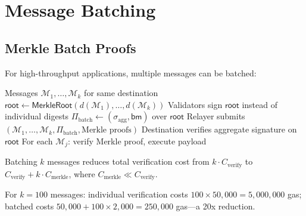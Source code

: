 \section{Message Batching}
\label{sec:batching}

\subsection{Merkle Batch Proofs}

For high-throughput applications, multiple messages can be batched:

\begin{algorithm}[H]
\caption{Batched Warp Delivery}
\label{alg:batch}
\begin{algorithmic}[1]
\Require Messages $\mathcal{M}_1, \ldots, \mathcal{M}_k$ for same destination
\State $\mathsf{root} \gets \mathsf{MerkleRoot}(d(\mathcal{M}_1), \ldots, d(\mathcal{M}_k))$
\State Validators sign $\mathsf{root}$ instead of individual digests
\State $\Pi_{\text{batch}} \gets (\sigma_{\text{agg}}, \mathsf{bm})$ over $\mathsf{root}$
\State Relayer submits $(\mathcal{M}_1, \ldots, \mathcal{M}_k, \Pi_{\text{batch}}, \text{Merkle proofs})$
\State Destination verifies aggregate signature on $\mathsf{root}$
\State For each $\mathcal{M}_j$: verify Merkle proof, execute payload
\end{algorithmic}
\end{algorithm}

\begin{proposition}
Batching $k$ messages reduces total verification cost from $k \cdot C_{\text{verify}}$ to $C_{\text{verify}} + k \cdot C_{\text{merkle}}$, where $C_{\text{merkle}} \ll C_{\text{verify}}$.
\end{proposition}

For $k = 100$ messages: individual verification costs $100 \times 50{,}000 = 5{,}000{,}000$ gas; batched costs $50{,}000 + 100 \times 2{,}000 = 250{,}000$ gas---a 20x reduction.

